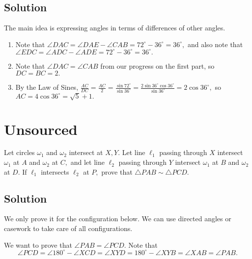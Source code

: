 \documentclass{article}
\begin{document}
\subsection{Solution}

The main idea is expressing angles in terms of differences of other angles.
\begin{enumerate}
\item Note that $\angle DAC=\angle DAE-\angle CAB=72^{\circ}-36^{\circ}=36^{\circ},$ and also note that $\angle EDC=\angle ADC-\angle ADE=72^{\circ}-36^{\circ}=36^{\circ}.$

\item Note that $\angle DAC=\angle CAB$ from our progress on the first part, so $DC=BC=2.$

\item By the Law of Sines, $\frac{AC}{DC}=\frac{AC}{2}=\frac{\sin 72^{\circ}}{\sin 36^{\circ}}=\frac{2\sin 36^{\circ}\cos 36^{\circ}}{\sin 36^{\circ}}=2\cos 36^{\circ},$ so $AC=4\cos 36^{\circ}=\sqrt{5}+1.$
\end{enumerate}

\pagebreak\section{Unsourced}

Let circles $\omega_1$ and $\omega_2$ intersect at $X,Y.$ Let line $\ell_1$ passing through $X$ intersect $\omega_1$ at $A$ and $\omega_2$ at $C,$ and let line $\ell_2$ passing through $Y$ intersect $\omega_1$ at $B$ and $\omega_2$ at $D.$ If $\ell_1$ intersects $\ell_2$ at $P,$ prove that $\triangle PAB\sim \triangle PCD.$

\subsection{Solution}

We only prove it for the configuration below. We can use directed angles or casework to take care of all configurations.

We want to prove that $\angle PAB=\angle PCD.$ Note that
\[\angle PCD=\angle 180^{\circ}-\angle XCD=\angle XYD=180^{\circ}-\angle XYB=\angle XAB=\angle PAB.\]
\end{document}
